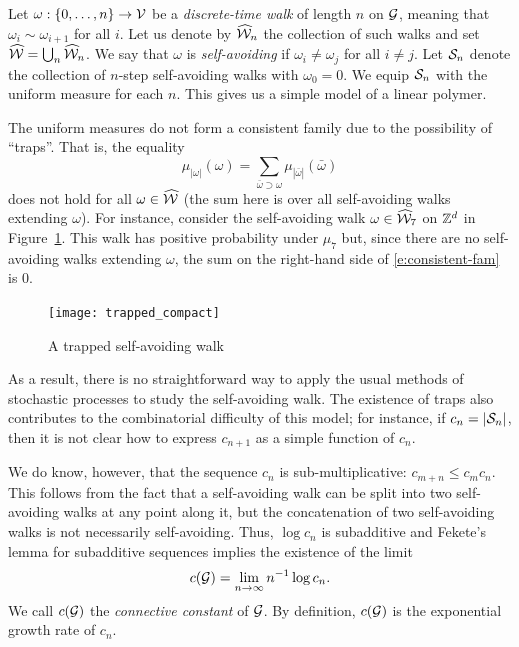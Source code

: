 \begin{example}
Let $\omega : \{0,\ldots,n\} \rightarrow \mathcal{V}$ be a \emph{discrete-time walk}
of length $n$ on $\mathcal{G}$, meaning that $\omega_i \sim \omega_{i+1}$ for all $i$. Let us
denote by $\widehat{\mathcal{W}}_n$ the collection of such walks and set $\widehat{\mathcal{W}} = \bigcup_n \widehat{\mathcal{W}}_n$.
We say that $\omega$ is \emph{self-avoiding} if $\omega_i \ne \omega_j$
for all $i \ne j$. Let $\mathcal{S}_n$ denote the collection of $n$-step
self-avoiding walks with $\omega_0 = 0$. We equip $\mathcal{S}_n$ with the uniform
measure for each $n$. This gives us a simple model of a linear polymer.

The uniform measures do not form a consistent family due to the possibility of ``traps''.
That is, the equality
\begin{equation}
\label{e:consistent-fam}
\mu_{|\omega|}(\omega) = \sum_{\bar\omega \supset \omega} \mu_{|\bar\omega|}(\bar\omega)
\end{equation}
does not hold for all $\omega\in\widehat{\mathcal{W}}$ (the sum here is over all self-avoiding walks extending $\omega$).
For instance, consider the self-avoiding walk $\omega\in\widehat{\mathcal{W}}_7$
on ${ {{\mathbb Z}}^d }$ in Figure~\ref{fig:trap}. This walk has positive probability under $\mu_7$ but,
since there are no self-avoiding walks extending $\omega$, the sum on the 
right-hand side of \eqref{e:consistent-fam} is $0$.

\begin{figure}[!htb]
\label{fig:trap}
\centering
\texttt{[image: trapped\_compact]}
\caption{A trapped self-avoiding walk}
\end{figure}

As a result, there is no straightforward way to apply the usual methods of stochastic processes
to study the self-avoiding walk. The existence of traps also contributes to the
combinatorial difficulty of this model; for instance, if $c_n = |\mathcal{S}_n|$, then it is
not clear how to express $c_{n+1}$ as a simple function of $c_n$.

We do know, however, that the sequence $c_n$ is sub-multiplicative: $c_{m+n} \le c_m c_n$.
This follows from the fact that a self-avoiding walk can be split into two self-avoiding
walks at any point along it, but the concatenation of two self-avoiding walks is not
necessarily self-avoiding. Thus, $\log c_n$ is subadditive and
Fekete's lemma for subadditive sequences implies the existence of the limit
\begin{equation}
c(\mathcal{G}) = \lim_{n\rightarrow\infty} n^{-1} \log c_n.
\end{equation}
We call $c(\mathcal{G})$ the \emph{connective constant} of $\mathcal{G}$.
By definition, $c(\mathcal{G})$ is the exponential growth rate of $c_n$.
\end{example}

